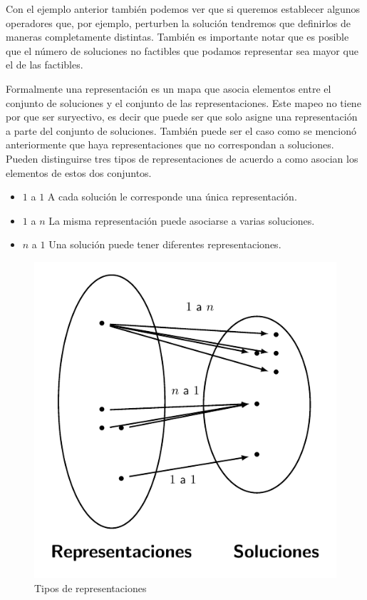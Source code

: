 Con el ejemplo anterior también podemos ver que si queremos establecer algunos operadores que, por ejemplo, perturben la solución tendremos que definirlos de maneras completamente distintas. También es importante notar que es posible que el número de soluciones no factibles que podamos representar sea mayor que el de las factibles.

Formalmente una representación es un mapa que asocia elementos entre el conjunto de soluciones y el conjunto de las representaciones. Este mapeo no tiene por que ser suryectivo, es decir que puede ser que solo asigne una representación a parte del conjunto de soluciones. También puede ser el caso como se mencionó anteriormente que haya representaciones que no correspondan a soluciones. Pueden distinguirse tres tipos de representaciones\cite{Cheng1996} de acuerdo a como asocian los elementos de estos dos conjuntos.
\begin{itemize}
    \item $1$ a $1$ A cada solución le corresponde una única representación.
    \item $1$ a $n$ La misma representación puede asociarse a varias soluciones.
    \item $n$ a $1$ Una solución puede tener diferentes representaciones.
\end{itemize}

\begin{figure}[H]
    \centering
    \includegraphics[scale=1]{Imagenes/representacion.pdf}
    \caption{Tipos de representaciones}
\end{figure}

